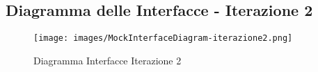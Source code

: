 \subsection{Diagramma delle Interfacce - Iterazione 2}
\begin{figure}[H]
    \centering
    \texttt{[image: images/MockInterfaceDiagram-iterazione2.png]}
    \caption{Diagramma Interfacce Iterazione 2}
\end{figure}
